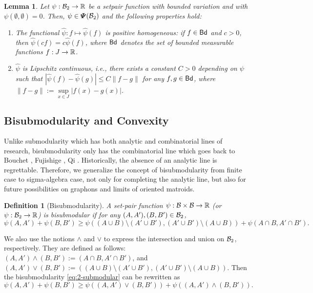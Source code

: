 \documentclass[12pt,a4paper]{article}
\newtheorem{lemma}[theorem]{Lemma}
\newtheorem{defn}[theorem]{Definition}
\begin{document}
\begin{lemma}
\label{lem:BV-is-Psi}
Let $\psi:\mathcal{B}_2\to\mathbb{R}$ be a setpair function with bounded variation and with $\psi(\emptyset,\emptyset)=0$. 
Then, $\psi\in\bm{\varPsi}(\mathcal{B}_2)$ and the following properties hold:
\begin{enumerate}
\item[(a)] The functional $\widehat{\psi}:f\mapsto \widehat{\psi}(f)$ is positive homogeneous: if $f\in{\sf Bd}$ and $c>0$, then $\widehat{\psi}(cf)=c\widehat{\psi}(f)$, where ${\sf Bd}$ denotes the set of bounded measurable functions $f:J\to\mathbb{R}$.
\item[(b)] $\widehat{\psi}$ is Lipschitz continuous, i.e., there exists a constant $C>0$ depending on $\psi$ such that 
$|\widehat{\psi}(f)-\widehat{\psi}(g)|\le C\|f-g\|$ for any $f,g\in{\sf Bd}$, where $\|f-g\|:=\sup\limits_{x\in J}|f(x)-g(x)|$.
\end{enumerate}
\end{lemma}
\subsection{Bisubmodularity and Convexity}

Unlike submodularity which has both analytic and combinatorial lines of research, bisubmodularity only has the combinatorial line which goes back to Bouchet \cite{Bouchet}, Fujishige \cite{Fujishige}, Qi \cite{Qi88}. 
Historically, the absence of an analytic line is regrettable. 
Therefore, we generalize the concept of bisubmodularity from finite case to sigma-algebra case, not only for completing the analytic line, but also for future possibilities on graphons and limits of oriented matroids.

\begin{defn}[Bisubmodularity]
A set-pair function $\psi:\mathcal{B}\times\mathcal{B}\to\mathbb{R}$ (or $\psi:\mathcal{B}_2\to \mathbb{R}$) is \emph{bisubmodular} if for any  $(A,A'),(B,B')\in \mathcal{B}_2$,
\begin{equation}\label{eq:2-submodular}
\psi(A,A')+\psi(B,B')\ge \psi((A\cup B)\setminus (A'\cup B'),(A'\cup B')\setminus(A\cup B))+\psi(A\cap B,A'\cap B').
\end{equation}
\end{defn}
We also use the notions $\wedge$ and $\vee$ to express the intersection and union on $\mathcal{B}_2$, respectively.  They are defined as follows:  $(A,A')\wedge (B,B'):=(A\cap B,A'\cap B')$, and $(A,A')\vee (B,B'):=((A\cup B)\setminus (A'\cup B'),(A'\cup B')\setminus(A\cup B))$. Then the bisubmodularity \eqref{eq:2-submodular} can be rewritten as 
\begin{equation}
\label{eq:bisub2}
\psi(A,A')+\psi(B,B')\ge \psi ((A,A')\vee (B,B'))+\psi ((A,A')\wedge (B,B')).     
\end{equation}
\end{document}
